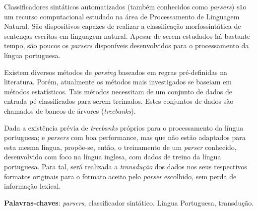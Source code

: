 \setlength{\absparsep}{18pt} %
\begin{resumo}

    Classificadores sintáticos automatizados (também conhecidos como \textit{parsers}) são um recurso computacional estudado 
    na área de Processamento de Linguagem Natural. São dispositivos capazes de realizar a classificação morfossintática de sentenças escritas em linguagem natural. Apesar de serem estudados há bastante tempo, são poucos os \textit{parsers} disponíveis desenvolvidos para o processamento da língua portuguesa.
    
    Existem diversos métodos de \textit{parsing} baseados em regras pré-definidas na literatura. Porém, atualmente os métodos mais investigados se baseiam em métodos estatísticos.
    Tais métodos necessitam de um conjunto de dados de entrada pé-classificados para serem treinados. Estes conjuntos de dados são chamados de bancos de árvores (\textit{treebanks}).
    
    Dada a existência prévia de \textit{treebanks} próprios para o processamento da língua portuguesa; e \textit{parsers} com boa performance, mas que não estão adaptados para esta mesma língua, 
    propõe-se, então, o treinamento de um \textit{parser} conhecido, desenvolvido com foco na língua inglesa, com dados de treino da língua portuguesa. Para tal, será realizada a \textit{transdução} dos dados
    nos seus respectivos formatos originais para o formato aceito pelo \textit{parser} escolhido, sem perda de informação lexical. 
    

 \textbf{Palavras-chaves}: \textit{parsers}, classificador sintático, Língua Portuguesa, transdução.
\end{resumo}